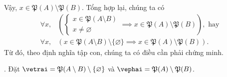 Vậy, $x \in \mathfrak{P}(A) \setminus \mathfrak{P}(B)$. Tổng hợp lại, chúng ta có
\begin{align*}
   \forall x, &\left( \begin{cases}
      x \in \mathfrak{P}(A \setminus B) \\
      x \neq \varnothing
   \end{cases} \implies x \in \mathfrak{P}(A) \setminus \mathfrak{P}(B) \right),\text{~hay} \\
   \forall x, &\left( x \in \mathfrak{P}(A \setminus B) \setminus \{\varnothing\} \implies x \in \mathfrak{P}(A) \setminus \mathfrak{P}(B) \right).
\end{align*}
Từ đó, theo định nghĩa tập con, chúng ta có điều cần phải chứng minh.

. Đặt $\vetrai = \mathfrak{P}(A \setminus B) \setminus \{\varnothing\}$ và $\vephai = \mathfrak{P}(A) \setminus \mathfrak{P}(B)$.


